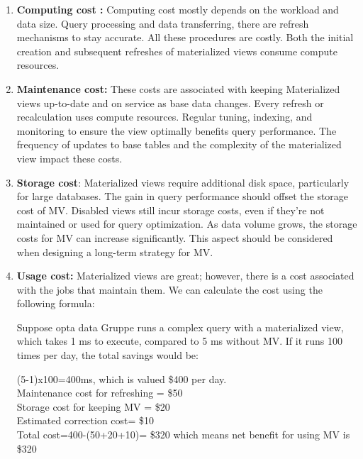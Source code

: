  \begin{enumerate}[label=\alph*)]
    \item \textbf{Computing cost :} Computing cost mostly depends on the workload and data size. Query processing and data transferring, there are refresh mechanisms to stay accurate. All these procedures are costly. Both the initial creation and subsequent refreshes of materialized views consume compute resources.
    
    \item \textbf{Maintenance cost:} These costs are associated with keeping Materialized views up-to-date and on service as base data changes. Every refresh or recalculation uses compute resources. Regular tuning, indexing, and monitoring to ensure the view optimally benefits query performance. The frequency of updates to base tables and the complexity of the materialized view impact these costs. 
    
    \item \textbf{Storage cost}: Materialized views require additional disk space, particularly for large databases. The gain in query performance should offset the storage cost of MV. Disabled views still incur storage costs, even if they're not maintained or used for query optimization. As data volume grows, the storage costs for MV can increase significantly. This aspect should be considered when designing a long-term strategy for MV. 
     
    \item \textbf{Usage cost:} Materialized views are great; however, there is a cost associated with the jobs that maintain them. We can calculate the cost using the following formula: \cite{10.1145/2206869.2206874}

    

  Suppose opta data Gruppe runs a complex query with a materialized view, which takes 1 ms to execute, compared to 5 ms without MV. If it runs 100 times per day, the total savings would be:
  
  (5-1)x100=400ms, which is valued \$400 per day.\\
   Maintenance cost for refreshing = \$50 \\
   Storage cost for keeping MV = \$20\\
   Estimated correction cost= \$10 \\
   Total cost={400-(50+20+10)}= \$320 which means net benefit for using MV is \$320

 
  
\end{enumerate}




